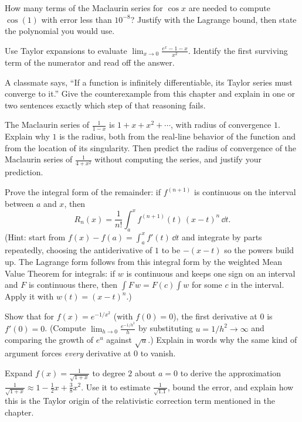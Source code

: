 \begin{exercise}
How many terms of the Maclaurin series for $\cos x$ are needed to compute
$\cos(1)$ with error less than $10^{-8}$? Justify with the Lagrange bound, then state
the polynomial you would use.
\end{exercise}

\begin{exercise}
Use Taylor expansions to evaluate
$\displaystyle \lim_{x\to 0}\frac{e^{x} - 1 - x}{x^2}$. Identify the first surviving
term of the numerator and read off the answer.
\end{exercise}

\begin{exercise}[Conceptual]
A classmate says, ``If a function is infinitely differentiable, its Taylor series must
converge to it.'' Give the counterexample from this chapter and explain in one or two
sentences exactly which step of that reasoning fails.
\end{exercise}

\begin{exercise}[Conceptual]
The Maclaurin series of $\frac{1}{1-x}$ is $1 + x + x^2 + \cdots$, with radius of
convergence $1$. Explain why $1$ is the radius, both from the real-line behavior of
the function and from the location of its singularity. Then predict the radius of
convergence of the Maclaurin series of $\frac{1}{4+x^2}$ without computing the series,
and justify your prediction.
\end{exercise}

\begin{exercise}[Proof]
Prove the integral form of the remainder: if $f^{(n+1)}$ is continuous on the interval
between $a$ and $x$, then
\[
  R_n(x) = \frac{1}{n!}\int_a^{x} f^{(n+1)}(t)\,(x-t)^n\,\dd t.
\]
(Hint: start from $f(x) - f(a) = \int_a^x f'(t)\,\dd t$ and integrate by parts
repeatedly, choosing the antiderivative of $1$ to be $-(x-t)$ so the powers build up.
The Lagrange form follows from this integral form by the
weighted Mean Value Theorem for integrals: if $w$ is continuous and keeps one sign on an
interval and $F$ is continuous there, then $\int F\,w = F(c)\int w$ for some $c$ in the
interval. Apply it with $w(t) = (x-t)^n$.)
\end{exercise}

\begin{exercise}[Proof]
Show that for $f(x) = e^{-1/x^2}$ (with $f(0)=0$), the first derivative at $0$ is
$f'(0) = 0$. (Compute $\lim_{h\to 0}\frac{e^{-1/h^2}}{h}$ by substituting
$u = 1/h^2 \to \infty$ and comparing the growth of $e^{u}$ against $\sqrt{u}$.) Explain
in words why the same kind of argument forces \emph{every} derivative at $0$ to vanish.
\end{exercise}

\begin{exercise}
Expand $f(x) = \frac{1}{\sqrt{1+x}}$ to degree $2$ about $a=0$ to derive the
approximation $\frac{1}{\sqrt{1+x}} \approx 1 - \tfrac12 x + \tfrac38 x^2$. Use it to
estimate $\frac{1}{\sqrt{1.1}}$, bound the error, and explain how this is the Taylor
origin of the relativistic correction term mentioned in the chapter.
\end{exercise}
